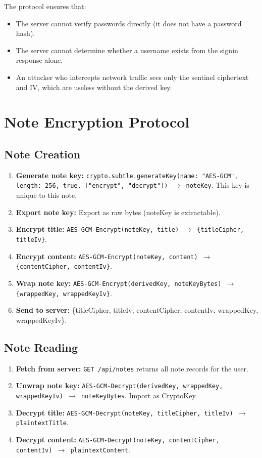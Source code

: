 The protocol ensures that:
\begin{itemize}
    \item The server cannot verify passwords directly (it does not have a password hash).
    \item The server cannot determine whether a username exists from the signin response alone.
    \item An attacker who intercepts network traffic sees only the sentinel ciphertext and IV, which are useless without the derived key.
\end{itemize}

\section{Note Encryption Protocol}

\subsection{Note Creation}

\begin{enumerate}
    \item \textbf{Generate note key:} \texttt{crypto.subtle.generateKey({name: "AES-GCM", length: 256}, true, ["encrypt", "decrypt"]) $\rightarrow$ noteKey}. This key is unique to this note.
    \item \textbf{Export note key:} Export as raw bytes (noteKey is extractable).
    \item \textbf{Encrypt title:} \texttt{AES-GCM-Encrypt(noteKey, title) $\rightarrow$ \{titleCipher, titleIv\}}.
    \item \textbf{Encrypt content:} \texttt{AES-GCM-Encrypt(noteKey, content) $\rightarrow$ \{contentCipher, contentIv\}}.
    \item \textbf{Wrap note key:} \texttt{AES-GCM-Encrypt(derivedKey, noteKeyBytes) $\rightarrow$ \{wrappedKey, wrappedKeyIv\}}.
    \item \textbf{Send to server:} \{titleCipher, titleIv, contentCipher, contentIv, wrappedKey, wrappedKeyIv\}.
\end{enumerate}

\subsection{Note Reading}

\begin{enumerate}
    \item \textbf{Fetch from server:} \texttt{GET /api/notes} returns all note records for the user.
    \item \textbf{Unwrap note key:} \texttt{AES-GCM-Decrypt(derivedKey, wrappedKey, wrappedKeyIv) $\rightarrow$ noteKeyBytes}. Import as CryptoKey.
    \item \textbf{Decrypt title:} \texttt{AES-GCM-Decrypt(noteKey, titleCipher, titleIv) $\rightarrow$ plaintextTitle}.
    \item \textbf{Decrypt content:} \texttt{AES-GCM-Decrypt(noteKey, contentCipher, contentIv) $\rightarrow$ plaintextContent}.
\end{enumerate}

